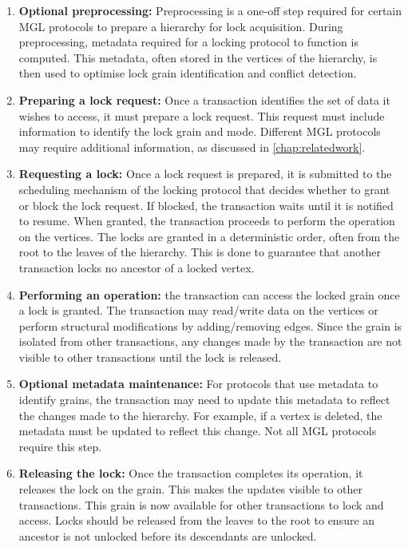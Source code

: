 \begin{enumerate}
    \item \textbf{Optional preprocessing:} Preprocessing is a one-off step required for certain MGL protocols to prepare a hierarchy for lock acquisition. During preprocessing, metadata required for a locking protocol to function is computed. This metadata, often stored in the vertices of the hierarchy, is then used to optimise lock grain identification and conflict detection. 
    \item \textbf{Preparing a lock request:} Once a transaction identifies the set of data it wishes to access, it must prepare a lock request. This request must include information to identify the lock grain and mode. Different MGL protocols may require additional information, as discussed in \cref{chap:relatedwork}.
    \item \textbf{Requesting a lock:} Once a lock request is prepared, it is submitted to the scheduling mechanism of the locking protocol that decides whether to grant or block the lock request. If blocked, the transaction waits until it is notified to resume. When granted, the transaction proceeds to perform the operation on the vertices. The locks are granted in a deterministic order, often from the root to the leaves of the hierarchy. This is done to guarantee that another transaction locks no ancestor of a locked vertex. 
    \item \textbf{Performing an operation:} the transaction can access the locked grain once a lock is granted. The transaction may read/write data on the vertices or perform structural modifications by adding/removing edges. Since the grain is isolated from other transactions, any changes made by the transaction are not visible to other transactions until the lock is released.
    \item \textbf{Optional metadata maintenance:} For protocols that use metadata to identify grains, the transaction may need to update this metadata to reflect the changes made to the hierarchy. For example, if a vertex is deleted, the metadata must be updated to reflect this change. Not all MGL protocols require this step.
    \item \textbf{Releasing the lock:} Once the transaction completes its operation, it releases the lock on the grain. This makes the updates visible to other transactions. This grain is now available for other transactions to lock and access. Locks should be released from the leaves to the root to ensure an ancestor is not unlocked before its descendants are unlocked.
\end{enumerate}



